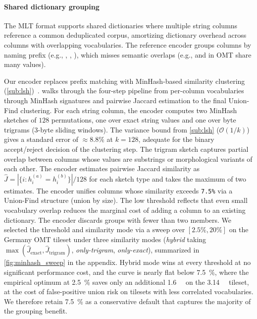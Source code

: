 \paragraph{Shared dictionary grouping}\label{sub:cardinality}
The \ac{MLT} format supports shared dictionaries where multiple string columns reference a common deduplicated corpus, amortizing dictionary overhead across columns with overlapping vocabularies.
The reference encoder groups columns by naming prefix (e.g., , , ), which misses semantic overlaps (e.g.,  and  in \ac{OMT} share many values).

\begin{sloppypar}
    Our encoder replaces prefix matching with MinHash-based similarity clustering (\cref{sub:lsh})~\cite{broderResemblanceContainmentDocuments1998}.
     walks through the four-step pipeline from per-column vocabularies through MinHash signatures and pairwise Jaccard estimation to the final Union-Find clustering.
    For each string column, the encoder computes two MinHash sketches of $128$ permutations, one over exact string values and one over byte trigrams (3-byte sliding windows).
    The variance bound from \cref{sub:lsh} ($\mathcal{O}(1/k)$) gives a standard error of $\approx 8.8\%$ at $k = 128$, adequate for the binary accept/reject decision of the clustering step.
    The trigram sketch captures partial overlap between columns whose values are substrings or morphological variants of each other.
    The encoder estimates pairwise Jaccard similarity as $\hat{J} = |\{i : h_i^{(a)} = h_i^{(b)}\}| / 128$ for each sketch type and takes the maximum of two estimates.
    The encoder unifies columns whose similarity exceeds \texttt{7.5\%} via a Union-Find structure (union by size).
The low threshold reflects that even small vocabulary overlap reduces the marginal cost of adding a column to an existing dictionary.
    The encoder discards groups with fewer than two members.
    We selected the threshold and similarity mode via a sweep over $[2.5\%, 20\%]$ on the Germany \ac{OMT} tileset under three similarity modes (\emph{hybrid} taking $\max(\hat{J}_\text{exact}, \hat{J}_\text{trigram})$, \emph{only-trigram}, \emph{only-exact}), summarized in \cref{fig:minhash_sweep} in the appendix.
    Hybrid mode wins at every threshold at no significant performance cost, and the curve is nearly flat below \qty{7.5}{\percent}, where the empirical optimum at \qty{2.5}{\percent} saves only an additional \qty{1.6}{\mega\byte} on the \qty{3.14}{\giga\byte} tileset, at the cost of false-positive union risk on tilesets with less correlated vocabularies.
    We therefore retain \qty{7.5}{\percent} as a conservative default that captures the majority of the grouping benefit.
\end{sloppypar}

